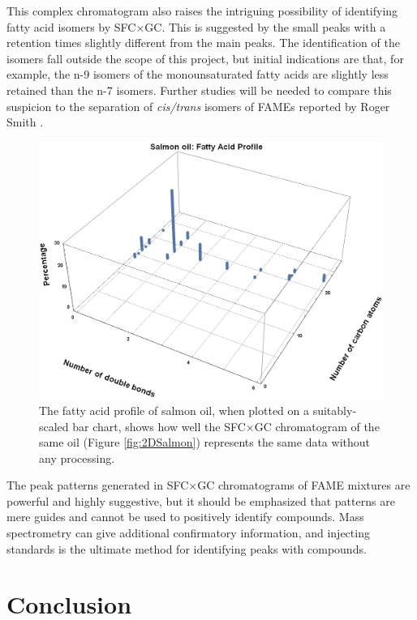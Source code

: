 This complex chromatogram also raises the intriguing possibility of identifying
fatty acid isomers by SFC×GC. This is suggested by the small peaks with a \oneD
retention times slightly different from the main peaks. The identification of
the isomers fall outside the scope of this project, but initial indications are
that, for example, the n-9 isomers of the monounsaturated fatty acids are
slightly less retained than the n-7 isomers. Further studies will be needed to
compare this suspicion to the separation of \textit{cis/trans} isomers of FAMEs
reported by Roger Smith \autocite{Smith2001}.

\begin{figure}
\centering
\includegraphics[width=\textwidth]{Figures/SalmonBarChart.png}
\decoRule

\caption[3D Bar chart of salmon oil fatty acid profile]{The fatty acid profile
of salmon oil, when plotted on a suitably-scaled bar chart, shows how well the
SFC×GC chromatogram of the same oil (Figure \ref{fig:2DSalmon}) represents
the same data without any processing.}

\label{fig:2DSalmonBarChart}
\end{figure}

The peak patterns generated in SFC×GC chromatograms of FAME mixtures are
powerful and highly suggestive, but it should be emphasized that patterns are
mere guides and cannot be used to positively identify compounds. Mass
spectrometry can give additional confirmatory information, and injecting
standards is the ultimate method for identifying peaks with compounds. 

\section{Conclusion}

